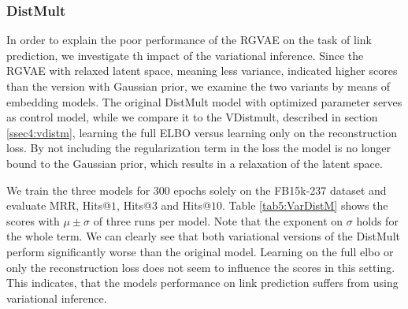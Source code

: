 \subsubsection{DistMult}

In order to explain the poor performance of the RGVAE on the task of link prediction, we investigate th impact of the variational inference. Since the RGVAE with relaxed latent space, meaning less variance, indicated higher scores than the version with Gaussian prior, we examine the two variants by means of embedding models. The original DistMult model with optimized parameter serves as control model, while we compare it to the VDistmult, described in section \ref{ssec4:vdistm}, learning the full ELBO versus learning only on the reconstruction loss. By not including the regularization term in the loss the model is no longer bound to the Gaussian prior, which results in a relaxation of the latent space.

We train the three models for $300$ epochs solely on the FB15k-237 dataset and evaluate MRR, Hits@$1$, Hits@$3$ and Hits@$10$. Table \ref{tab5:VarDistM} shows the scores with $\mu \pm \sigma$ of three runs per model. Note that the exponent on $\sigma$ holds for the whole term. We can clearly see that both variational versions of the DistMult perform significantly worse than the original model. Learning on the full elbo or only the reconstruction loss does not seem to influence the scores in this setting. This indicates, that the models performance on link prediction suffers from using variational inference.





